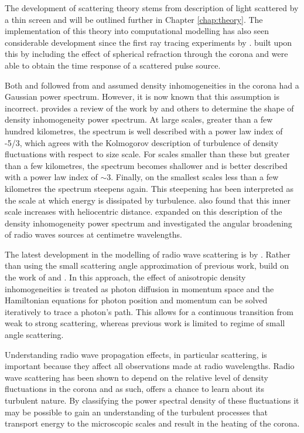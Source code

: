 The development of scattering theory stems from \cite{Chandrasekhar1952} description of light scattered by a thin screen and will be outlined further in Chapter \ref{chap:theory}. The implementation of this theory into computational modelling has also seen considerable development since the first ray tracing experiments by \cite{Fokker1965}. \cite{Steinberg1971} built upon this by including the effect of spherical refraction through the corona and were able to obtain the time response of a scattered pulse source.

Both \cite{Fokker1965} and \cite{Steinberg1971} followed from \cite{Chandrasekhar1952} and assumed density inhomogeneities in the corona had a Gaussian power spectrum. However, it is now known that this assumption is incorrect. \cite{Bastian1994} provides a review of the work by \cite{Coles1989} and others to determine the shape of density inhomogeneity power spectrum. At large scales, greater than a few hundred kilometres, the spectrum is well described with a power law index of -5/3, which agrees with the Kolmogorov description of turbulence \citep{Kolmogorov1941} of density fluctuations with respect to size scale. For scales smaller than these but greater than a few kilometres, the spectrum becomes shallower and is better described with a power law index of $\sim 3$. Finally, on the smallest scales less than a few kilometres the spectrum steepens again. This steepening has been interpreted as the scale at which energy is dissipated by turbulence. \cite{Coles1989} also found that this inner scale increases with heliocentric distance. \cite{Bastian1994} expanded on this description of the density inhomogeneity power spectrum and investigated the angular broadening of radio waves sources at centimetre wavelengths.

The latest development in the modelling of radio wave scattering is by \cite{Kontar2019}. Rather than using the small scattering angle approximation of previous work, \cite{Kontar2019} build on the work of \cite{Arzner1999} and \cite{Bian2019}. In this approach, the effect of anisotropic density inhomogeneities is treated as photon diffusion in momentum space and the Hamiltonian equations for photon position and momentum can be solved iteratively to trace a photon's path. This allows for a continuous transition from weak to strong scattering, whereas previous work is limited to regime of small angle scattering. 

Understanding radio wave propagation effects, in particular scattering, is important because they affect all observations made at radio wavelengths. Radio wave scattering has been shown to depend on the relative level of density fluctuations in the corona and as such, offers a chance to learn about its turbulent nature. By classifying the power spectral density of these fluctuations it may be possible to gain an understanding of the turbulent processes that transport energy to the microscopic scales and result in the heating of the corona. 


